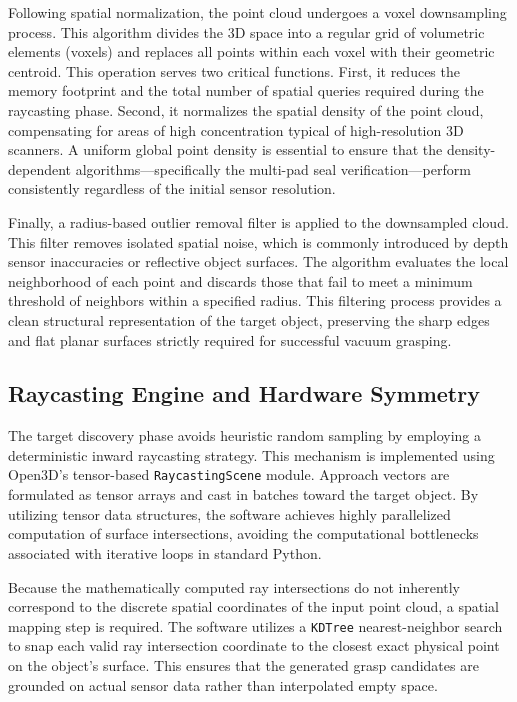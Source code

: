 Following spatial normalization, the point cloud undergoes a voxel downsampling process.  This algorithm divides the 3D space into a regular grid of volumetric elements (voxels) and replaces all points within each voxel with their geometric centroid. This operation serves two critical functions. First, it reduces the memory footprint and the total number of spatial queries required during the raycasting phase. Second, it normalizes the spatial density of the point cloud, compensating for areas of high concentration typical of high-resolution 3D scanners. A uniform global point density is essential to ensure that the density-dependent algorithms—specifically the multi-pad seal verification—perform consistently regardless of the initial sensor resolution.

Finally, a radius-based outlier removal filter is applied to the downsampled cloud. This filter removes isolated spatial noise, which is commonly introduced by depth sensor inaccuracies or reflective object surfaces. The algorithm evaluates the local neighborhood of each point and discards those that fail to meet a minimum threshold of neighbors within a specified radius. This filtering process provides a clean structural representation of the target object, preserving the sharp edges and flat planar surfaces strictly required for successful vacuum grasping.


\subsection{Raycasting Engine and Hardware Symmetry}

The target discovery phase avoids heuristic random sampling by employing a deterministic inward raycasting strategy.  This mechanism is implemented using Open3D's tensor-based \texttt{RaycastingScene} module. Approach vectors are formulated as tensor arrays and cast in batches toward the target object. By utilizing tensor data structures, the software achieves highly parallelized computation of surface intersections, avoiding the computational bottlenecks associated with iterative loops in standard Python.

Because the mathematically computed ray intersections do not inherently correspond to the discrete spatial coordinates of the input point cloud, a spatial mapping step is required. The software utilizes a \texttt{KDTree} nearest-neighbor search to snap each valid ray intersection coordinate to the closest exact physical point on the object's surface. This ensures that the generated grasp candidates are grounded on actual sensor data rather than interpolated empty space.

